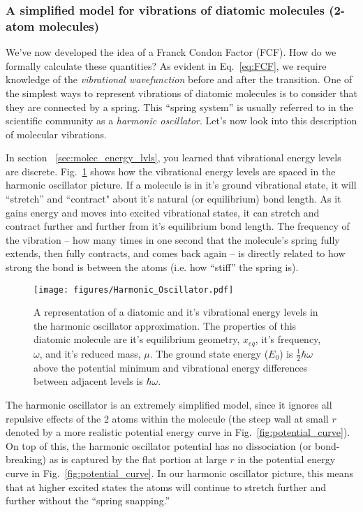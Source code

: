 \documentclass[12pt]{article}
\begin{document}
\subsubsection{A simplified model for vibrations of diatomic molecules (2-atom molecules)}

We've now developed the idea of a Franck Condon Factor (FCF). How do we formally calculate these quantities?
As evident in Eq.~\eqref{eq:FCF}, we require knowledge of the {\it vibrational wavefunction} before and after the transition.
One of the simplest ways to represent vibrations of diatomic molecules is to consider that they are connected by a spring.
This ``spring system'' is usually referred to in the scientific community as a {\it harmonic oscillator}. Let's now look into this description of molecular vibrations.

In section ~\ref{sec:molec_energy_lvls}, you learned that vibrational energy levels are discrete.
Fig.~\ref{fig:harmonic_curve} shows how the vibrational energy levels are spaced in the harmonic oscillator picture. If a molecule is in it's ground vibrational state, it will ``stretch'' and ``contract" about it’s natural (or equilibrium) bond length. As it gains energy and moves into excited vibrational states, it can stretch and contract further and further from it’s equilibrium bond length. The frequency of the vibration -- how many times in one second that the molecule's spring fully extends, then fully contracts, and comes back again -- is directly related to how strong the bond is between the atoms (i.e. how ``stiff'' the spring is).

\begin{figure}
    \begin{center}
        \texttt{[image: figures/Harmonic\_Oscillator.pdf]}
    \end{center}
    \caption{
        A representation of a diatomic and it's vibrational energy levels in the harmonic oscillator approximation. The properties of this diatomic molecule are it's equilibrium geometry, $x_{eq}$, it's frequency, $\omega$, and it's reduced mass, $\mu$. The ground state energy ($E_0$) is $\frac{1}{2}\hbar\omega$ above the potential minimum and vibrational energy differences between adjacent levels is $\hbar\omega$.
    }
    \label{fig:harmonic_curve}
\end{figure}

The harmonic oscillator is an extremely simplified model, since it ignores all repulsive effects of the 2 atoms within the molecule (the steep wall at small $r$ denoted by a more realistic potential energy curve in Fig.~\ref{fig:potential_curve}). On top of this, the harmonic oscillator potential has no dissociation (or bond-breaking) as is captured by the flat portion at large $r$ in the potential energy curve in Fig.~\ref{fig:potential_curve}. In our harmonic oscillator picture, this means that at higher excited states the atoms will continue to stretch further and further without the ``spring snapping.''
\end{document}

